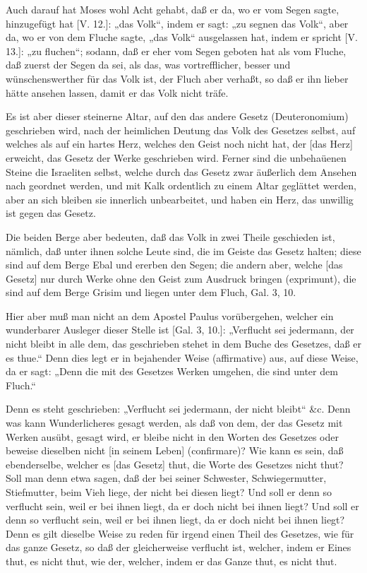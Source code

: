 Auch darauf hat Moses wohl Acht gehabt, daß er da, wo er vom Segen sagte, hinzugefügt hat [V. 12.]: „das Volk“, indem er sagt: „zu segnen das Volk“, aber da, wo er von dem Fluche sagte, „das Volk“ ausgelassen hat, indem er spricht [V. 13.]: „zu fluchen“; sodann, daß er eher vom Segen geboten hat als vom Fluche, daß zuerst der Segen da sei, als das, was vortrefflicher, besser und wünschenswerther für das Volk ist, der Fluch aber verhaßt, so daß er ihn lieber hätte ansehen lassen, damit er das Volk nicht träfe.

Es ist aber dieser steinerne Altar, auf den das andere Gesetz (Deuteronomium) geschrieben wird, nach der heimlichen Deutung das Volk des Gesetzes selbst, auf welches als auf ein hartes Herz, welches den Geist noch nicht hat, der [das Herz] erweicht, das Gesetz der Werke geschrieben wird. Ferner sind die unbehaüenen Steine die Israeliten selbst, welche durch das Gesetz zwar äußerlich dem Ansehen nach geordnet werden, und mit Kalk ordentlich zu einem Altar geglättet werden, aber an sich bleiben sie innerlich unbearbeitet, und haben ein Herz, das unwillig ist gegen das Gesetz.

Die beiden Berge aber bedeuten, daß das Volk in zwei Theile geschieden ist, nämlich, daß unter ihnen solche Leute sind, die im Geiste das Gesetz halten; diese sind auf dem Berge Ebal und ererben den Segen; die andern aber, welche [das Gesetz] nur durch Werke ohne den Geist zum Ausdruck bringen (exprimunt), die sind auf dem Berge Grisim und liegen unter dem Fluch, Gal. 3, 10.

Hier aber muß man nicht an dem Apostel Paulus vorübergehen, welcher ein wunderbarer Ausleger dieser Stelle ist [Gal. 3, 10.]: „Verflucht sei jedermann, der nicht bleibt in alle dem, das geschrieben stehet in dem Buche des Gesetzes, daß er es thue.“ Denn dies legt er in bejahender Weise (affirmative) aus, auf diese Weise, da er sagt: „Denn die mit des Gesetzes Werken umgehen, die sind unter dem Fluch.“

Denn es steht geschrieben: „Verflucht sei jedermann, der nicht bleibt“ \&c. Denn was kann Wunderlicheres gesagt werden, als daß von dem, der das Gesetz mit Werken ausübt, gesagt wird, er bleibe nicht in den Worten des Gesetzes oder beweise dieselben nicht [in seinem Leben] (confirmare)? Wie kann es sein, daß ebenderselbe, welcher es [das Gesetz] thut, die Worte des Gesetzes nicht thut? Soll man denn etwa sagen, daß der bei seiner Schwester, Schwiegermutter, Stiefmutter, beim Vieh liege, der nicht bei diesen liegt? Und soll er denn so verflucht sein, weil er bei ihnen liegt, da er doch nicht bei ihnen liegt? Und soll er denn so verflucht sein, weil er bei ihnen liegt, da er doch nicht bei ihnen liegt? Denn es gilt dieselbe Weise zu reden für irgend einen Theil des Gesetzes, wie für das ganze Gesetz, so daß der gleicherweise verflucht ist, welcher, indem er Eines thut, es nicht thut, wie der, welcher, indem er das Ganze thut, es nicht thut.

